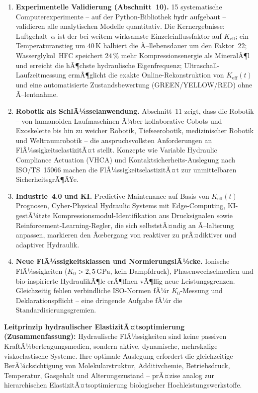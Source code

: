 ﻿\documentclass[a4paper,12pt]{scrreprt}
\theoremstyle{definition}
\begin{document}
\begin{enumerate}
  \item \textbf{Experimentelle Validierung (Abschnitt~10).}
    15 systematische Computerexperimente -- auf der Python-Bibliothek
    \texttt{hydr} aufgebaut -- validieren alle analytischen Modelle
    quantitativ. Die Kernergebnisse: Luftgehalt~$\alpha$ ist der
    bei weitem wirksamste Einzeleinflussfaktor auf $K_{\mathrm{eff}}$;
    ein Temperaturanstieg um $40\,\mathrm{K}$ halbiert die Ã–llebensdauer
    um den Faktor~22; Wasserglykol~HFC speichert $24\,\%$ mehr
    Kompressionsenergie als MineralÃ¶l und erreicht die hÃ¶chste
    hydraulische Eigenfrequenz; Ultraschall-Laufzeitmessung ermÃ¶glicht
    die exakte Online-Rekonstruktion von $K_{\mathrm{eff}}(t)$ und
    eine automatisierte Zustandsbewertung (GREEN/YELLOW/RED) ohne
    Ã–lentnahme.

  \item \textbf{Robotik als SchlÃ¼sselanwendung.}
    Abschnitt~11 zeigt, dass die Robotik -- von humanoiden Laufmaschinen
    Ã¼ber kollaborative Cobots und Exoskelette bis hin zu weicher Robotik,
    Tiefseerobotik, medizinischer Robotik und Weltraumrobotik -- die
    anspruchsvollsten Anforderungen an FlÃ¼ssigkeitselastizitÃ¤t stellt.
    Konzepte wie Variable Hydraulic Compliance Actuation (VHCA) und
    Kontaktsicherheits-Auslegung nach ISO/TS~15066 machen die
    FlÃ¼ssigkeitselastizitÃ¤t zur unmittelbaren SicherheitsgrÃ¶ÃŸe.

  \item \textbf{Industrie~4.0 und KI.}
    Predictive Maintenance auf Basis von $K_\mathrm{eff}(t)$-Prognosen,
    Cyber-Physical Hydraulic Systems mit Edge-Computing, KI-gestÃ¼tzte
    Kompressions\-modul-Identifikation aus Drucksignalen sowie
    Reinforcement-Learning-Regler, die sich selbststÃ¤ndig an Ã–lalterung
    anpassen, markieren den Ãœbergang von reaktiver zu prÃ¤diktiver
    und adaptiver Hydraulik.

  \item \textbf{Neue FlÃ¼ssigkeitsklassen und NormierungslÃ¼cke.}
    Ionische FlÃ¼ssigkeiten ($K_0 > 2{,}5\,\mathrm{GPa}$, kein Dampfdruck),
    Phasenwechselmedien und bio-inspirierte HydraulikÃ¶le erÃ¶ffnen
    vÃ¶llig neue Leistungsgrenzen. Gleichzeitig fehlen verbindliche
    ISO-Normen fÃ¼r $K_0$-Messung und Deklarationspflicht -- eine
    dringende Aufgabe fÃ¼r die Standardisierungsgremien.
\end{enumerate}

\begin{infobox}
\textbf{Leitprinzip hydraulischer ElastizitÃ¤tsoptimierung (Zusammenfassung):}
Hydraulische FlÃ¼ssigkeiten sind keine passiven KraftÃ¼bertragungsmedien,
sondern aktive, dynamische, mehrskalige viskoelastische Systeme. Ihre
optimale Auslegung erfordert die gleichzeitige BerÃ¼cksichtigung von
Molekularstruktur, Additivchemie, Betriebsdruck, Temperatur, Gasgehalt
und Alterungszustand -- prÃ¤zise analog zur hierarchischen
ElastizitÃ¤tsoptimierung biologischer Hochleistungswerkstoffe.
\end{infobox}
\end{document}
